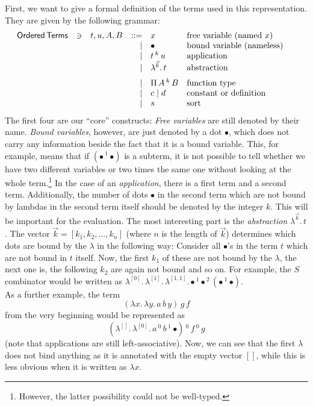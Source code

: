 \documentclass[12pt, a4paper, titlepage]{article}
\newcommand{\ovar}{\mathord{\bullet}}
\newcommand{\sspace}{\,}
\newcommand{\la}{\lambda}
\newcommand{\emptyVec}{[]}
\newcommand{\ve}[1]{[#1]}
\newcommand{\ApA}[2]{#1 \sspace #2}
\newcommand{\LaA}[2]{\la {#1}. \sspace #2}
\newcommand{\ApO}[3]{#1 \sspace ^{#2} \sspace #3}
\newcommand{\LaO}[2]{\la ^{#1} . \sspace #2}
\newcommand{\PiO}[3]{\Pi \sspace #1 \sspace ^{#2} \sspace #3}
\newcommand{\pa}[1]{\left( #1 \right)}
\begin{document}
First, we want to give a formal definition of the terms used in this representation. They are given by the following grammar:
\[
\begin{array}{lllrll@{\qquad}}
\mathsf{Ordered\,Terms}       & \ni & t,u,A,B & ::= & x & \mbox{free variable (named $x$)} \\
			                   &&& \mid & \ovar & \mbox{bound variable (nameless)} \\
			                   &&& \mid & \ApO t k u & \mbox{application} \\
			                   &&& \mid & \LaO {\vec k} t & \mbox{abstraction} \\
\noalign{\medskip}
			                   &&& \mid & \PiO A k B  & \mbox{function type} \\
			                   &&& \mid & c \mid d  & \mbox{constant or definition} \\
			                   &&& \mid & s  & \mbox{sort} 
\end{array}
\]
The first four are our ``core'' constructs: \emph{Free variables} are still denoted by their name. \emph{Bound variables}, however, are just denoted by a dot $\ovar$, which does not carry any information beside the fact that it is a bound variable. This, for example, means that if $\left(\ApO \ovar 1 \ovar \right)$ is a subterm, it is not possible to tell whether we have two different variables or two times the same one without looking at the whole term.\footnote{However, the latter possibility could not be well-typed.} 
In the case of an \emph{application}, there is a first term and a second term. Additionally, the number of dots $\ovar$ in the second term which are not bound by lambdas in the second term itself should be denoted by the integer $k$. This will be important for the evaluation. 
The most interesting part is the \emph{abstraction} $\LaO {\vec k} t$. The vector $\vec k = \ve{k_1, k_2, \ldots, k_n}$ (where $n$ is the length of $\vec k$) determines which dots are bound by the $\la$ in the following way: Consider all $\ovar$'s in the term $t$ which are not bound in $t$ itself. Now, the first $k_1$ of these are not bound by the $\la$, the next one is, the following $k_2$ are again not bound and so on. For example, the $S$ combinator would be written as $\LaO {\ve 0} {\LaO {\ve 1} {\LaO {\ve{1,1}} {\ApO {\ApO \ovar 1 \ovar} 2 {\pa{\ApO \ovar 1 \ovar}}}}}$.
\\
As a further example, the term 
\[
(\LaA x {\LaA y {\ApA{\ApA a b} y}}) \sspace g \sspace f
\]
from the very beginning would be represented as
\[
\ApO{\left(\ApO {\LaO{\emptyVec}{\LaO{\ve 0}{\ApO{\ApO{a}{0}{b}}{1}{\ovar}}}\right)}  0 f } 0 g
\]
(note that applications are still left-associative). Now, we can see that the first $\la$ does not bind anything as it is annotated with the empty vector $\emptyVec$, while this is less obvious when it is written as $\la x$.
\end{document}
